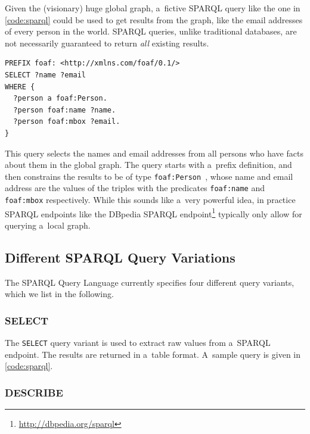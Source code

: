 Given the (visionary) huge global graph, a~fictive
SPARQL query like the one in \autoref{code:sparql}
could be used to get results from the graph,
like the email addresses of every person in the world.
SPARQL queries, unlike traditional databases, are not necessarily
guaranteed to return \emph{all} existing results.

\begin{lstlisting}[caption={[SPARQL query returning the names and
  email addresses of every person in the world.]
  {SPARQL query returning the names and email addresses of every
  person in the world.
  Source: \url{http://en.wikipedia.org/wiki/SPARQL\#Benefits}.}},
  label={code:sparql}]
PREFIX foaf: <http://xmlns.com/foaf/0.1/>
SELECT ?name ?email
WHERE {
  ?person a foaf:Person.
  ?person foaf:name ?name.
  ?person foaf:mbox ?email.
}
\end{lstlisting}

This query selects the names and email addresses from all persons
who have facts about them in the global graph.
The query starts with a~prefix definition,
and then constrains the results
to be of type \texttt{foaf:Person}~\cite{brickley2010foaf},
whose name and email address are the values
of the triples with the predicates \texttt{foaf:name}
and \texttt{foaf:mbox} respectively.
While this sounds like a~very powerful idea,
in practice SPARQL endpoints
like the DBpedia SPARQL
endpoint\footnote{\url{http://dbpedia.org/sparql}}
typically only allow for querying a~local graph.

\subsection{Different SPARQL Query Variations}

The SPARQL Query Language currently specifies four different query variants, which we list in the following. 

\subsubsection{SELECT}

The \texttt{SELECT} query variant is used to extract
raw values from a~SPARQL endpoint.
The results are returned in a~table format.
A~sample query is given in \autoref{code:sparql}.

\subsubsection{DESCRIBE}

